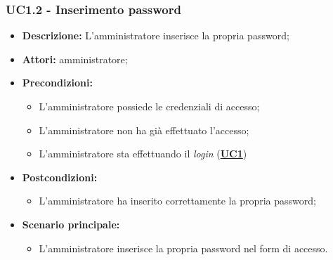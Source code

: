 \subsubsection{UC1.2 - Inserimento password}
\label{sec:UC1.2}
\begin{itemize}
	\item \textbf{Descrizione:} L’amministratore inserisce la propria password;
	\item \textbf{Attori:} amministratore;
	\item \textbf{Precondizioni:} 
	\begin{itemize}
		\item L’amministratore possiede le credenziali di accesso;
		\item L’amministratore non ha già effettuato l’accesso;
		\item L’amministratore sta effettuando il \textit{login} (\hyperref[sec:UC1]{\textbf{UC1}})
	\end{itemize}
	\item \textbf{Postcondizioni:} 
	\begin{itemize}
		\item L’amministratore ha inserito correttamente la propria password;
	\end{itemize}
	\item \textbf{Scenario principale:} 
	\begin{itemize}
		\item L’amministratore inserisce la propria password nel form di accesso.
	\end{itemize}
\end{itemize}


